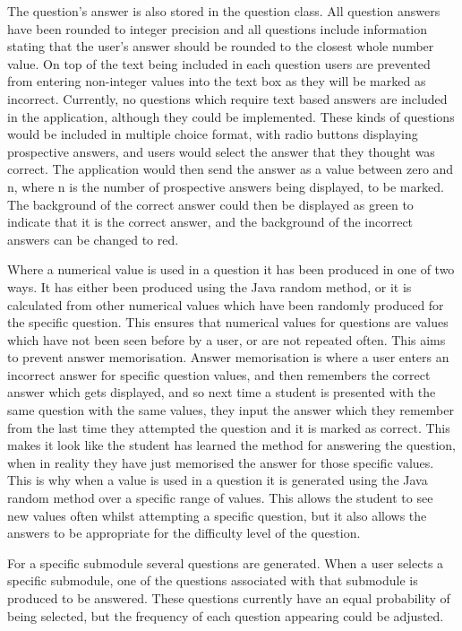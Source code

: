 \documentclass{article}
\begin{document}
The question's answer is also stored in the question class. All question answers have been rounded to integer precision and all questions include information stating that the user's answer should be rounded to the closest whole number value. On top of the text being included in each question users are prevented from entering non-integer values into the text box as they will be marked as incorrect. Currently, no questions which require text based answers are included in the application, although they could be implemented. These kinds of questions would be included in multiple choice format, with radio buttons displaying prospective answers, and users would select the answer that they thought was correct. The application would then send the answer as a value between zero and n, where n is the number of prospective answers being displayed, to be marked. The background of the correct answer could then be displayed as green to indicate that it is the correct answer, and the background of the incorrect answers can be changed to red. \par

Where a numerical value is used in a question it has been produced in one of two ways. It has either been produced using the Java random method, or it is calculated from other numerical values which have been randomly produced for the specific question. This ensures that numerical values for questions are values which have not been seen before by a user, or are not repeated often. This aims to prevent answer memorisation. Answer memorisation is where a user enters an incorrect answer for specific question values, and then remembers the correct answer which gets displayed, and so next time a student is presented with the same question with the same values, they input the answer which they remember from the last time they attempted the question and it is marked as correct. This makes it look like the student has learned the method for answering the question, when in reality they have just memorised the answer for those specific values. This is why when a value is used in a question it is generated using the Java random method over a specific range of values. This allows the student to see new values often whilst attempting a specific question, but it also allows the answers to be appropriate for the difficulty level of the question. \par

For a specific submodule several questions are generated. When a user selects a specific submodule, one of the questions associated with that submodule is produced to be answered. These questions currently have an equal probability of being selected, but the frequency of each question appearing could be adjusted. \par
\end{document}
